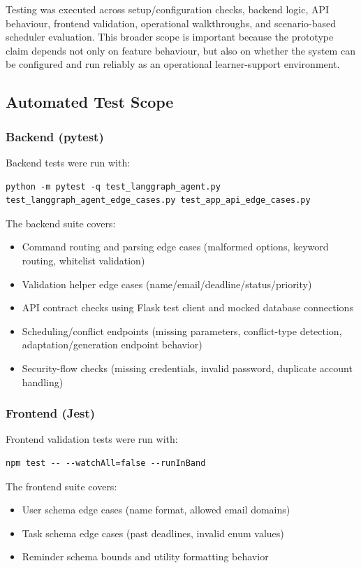 \documentclass[12pt]{article}
\begin{document}
Testing was executed across setup/configuration checks, backend logic, API behaviour, frontend validation, operational walkthroughs, and scenario-based scheduler evaluation. This broader scope is important because the prototype claim depends not only on feature behaviour, but also on whether the system can be configured and run reliably as an operational learner-support environment.

\subsection{Automated Test Scope}

\subsubsection{Backend (pytest)}
Backend tests were run with:
\begin{verbatim}
python -m pytest -q test_langgraph_agent.py test_langgraph_agent_edge_cases.py test_app_api_edge_cases.py
\end{verbatim}

The backend suite covers:
\begin{itemize}
    \item Command routing and parsing edge cases (malformed options, keyword routing, whitelist validation)
    \item Validation helper edge cases (name/email/deadline/status/priority)
    \item API contract checks using Flask test client and mocked database connections
    \item Scheduling/conflict endpoints (missing parameters, conflict-type detection, adaptation/generation endpoint behavior)
    \item Security-flow checks (missing credentials, invalid password, duplicate account handling)
\end{itemize}

\subsubsection{Frontend (Jest)}
Frontend validation tests were run with:
\begin{verbatim}
npm test -- --watchAll=false --runInBand
\end{verbatim}

The frontend suite covers:
\begin{itemize}
    \item User schema edge cases (name format, allowed email domains)
    \item Task schema edge cases (past deadlines, invalid enum values)
    \item Reminder schema bounds and utility formatting behavior
\end{itemize}
\end{document}
